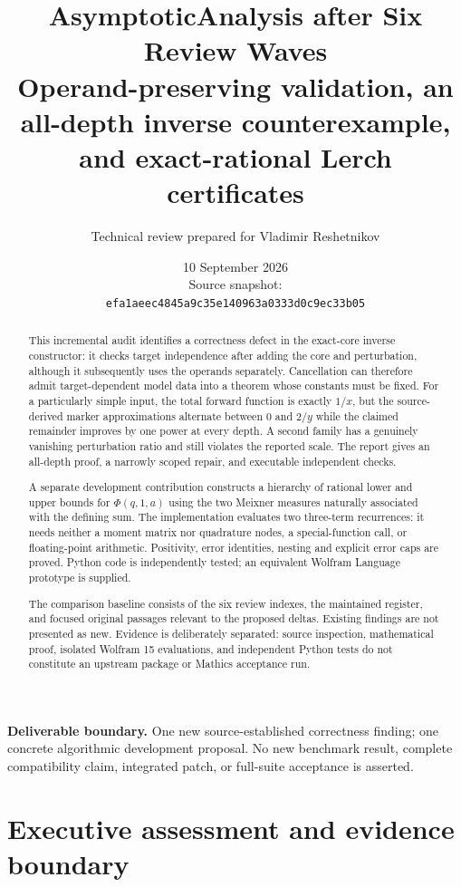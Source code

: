 \documentclass[11pt,a4paper]{article}
\title{\textbf{AsymptoticAnalysis after Six Review Waves}\\[0.5em]
\large Operand-preserving validation, an all-depth inverse counterexample,\\
and exact-rational Lerch certificates}
\author{Technical review prepared for Vladimir Reshetnikov}
\date{10 September 2026\\[0.6em]\small Source snapshot:\\
\texttt{efa1aeec4845a9c35e140963a0333d0c9ec33b05}}
\theoremstyle{remark}\newtheorem{remark}[theorem]{Remark}
\begin{document}
\maketitle
\thispagestyle{empty}
\begin{abstract}
This incremental audit identifies a correctness defect in the exact-core inverse
constructor: it checks target independence after adding the core and perturbation,
although it subsequently uses the operands separately. Cancellation can therefore
admit target-dependent model data into a theorem whose constants must be fixed.
For a particularly simple input, the total forward function is exactly $1/x$,
but the source-derived marker approximations alternate between $0$ and $2/y$ while
the claimed remainder improves by one power at every depth. A second family has
a genuinely vanishing perturbation ratio and still violates the reported scale.
The report gives an all-depth proof, a narrowly scoped repair, and executable
independent checks.

A separate development contribution constructs a hierarchy of rational lower and
upper bounds for $\Phi(q,1,a)$ using the two Meixner measures naturally associated
with the defining sum. The implementation evaluates two three-term recurrences:
it needs neither a moment matrix nor quadrature nodes, a special-function call,
or floating-point arithmetic. Positivity, error identities, nesting and explicit
error caps are proved. Python code is independently tested; an equivalent Wolfram
Language prototype is supplied.

The comparison baseline consists of the six review indexes, the maintained
register, and focused original passages relevant to the proposed deltas. Existing
findings are not presented as new. Evidence is deliberately separated: source
inspection, mathematical proof, isolated Wolfram 15 evaluations, and independent
Python tests do not constitute an upstream package or Mathics acceptance run.
\end{abstract}
\vfill
\textbf{Deliverable boundary.} One new source-established correctness finding;
one concrete algorithmic development proposal. No new benchmark result, complete
compatibility claim, integrated patch, or full-suite acceptance is asserted.
\newpage
\begingroup
\small
\setlength{\parskip}{0pt}
\tableofcontents
\endgroup
\newpage

\section{Executive assessment and evidence boundary}
\label{sec:assessment}
\end{document}
